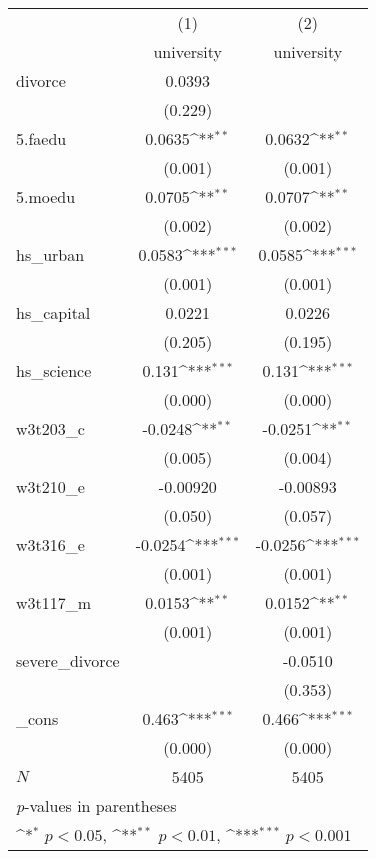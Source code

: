 {
\def\sym#1{\ifmmode^{#1}\else\(^{#1}\)\fi}
\begin{tabular}{l*{2}{c}}
\hline\hline
            &\multicolumn{1}{c}{(1)}&\multicolumn{1}{c}{(2)}\\
            &\multicolumn{1}{c}{university}&\multicolumn{1}{c}{university}\\
\hline
divorce     &      0.0393         &                     \\
            &     (0.229)         &                     \\
[1em]
5.faedu     &      0.0635\sym{**} &      0.0632\sym{**} \\
            &     (0.001)         &     (0.001)         \\
[1em]
5.moedu     &      0.0705\sym{**} &      0.0707\sym{**} \\
            &     (0.002)         &     (0.002)         \\
[1em]
hs\_urban    &      0.0583\sym{***}&      0.0585\sym{***}\\
            &     (0.001)         &     (0.001)         \\
[1em]
hs\_capital  &      0.0221         &      0.0226         \\
            &     (0.205)         &     (0.195)         \\
[1em]
hs\_science  &       0.131\sym{***}&       0.131\sym{***}\\
            &     (0.000)         &     (0.000)         \\
[1em]
w3t203\_c    &     -0.0248\sym{**} &     -0.0251\sym{**} \\
            &     (0.005)         &     (0.004)         \\
[1em]
w3t210\_e    &    -0.00920         &    -0.00893         \\
            &     (0.050)         &     (0.057)         \\
[1em]
w3t316\_e    &     -0.0254\sym{***}&     -0.0256\sym{***}\\
            &     (0.001)         &     (0.001)         \\
[1em]
w3t117\_m    &      0.0153\sym{**} &      0.0152\sym{**} \\
            &     (0.001)         &     (0.001)         \\
[1em]
severe\_divorce&                     &     -0.0510         \\
            &                     &     (0.353)         \\
[1em]
\_cons      &       0.463\sym{***}&       0.466\sym{***}\\
            &     (0.000)         &     (0.000)         \\
\hline
\(N\)       &        5405         &        5405         \\
\hline\hline
\multicolumn{3}{l}{\footnotesize \textit{p}-values in parentheses}\\
\multicolumn{3}{l}{\footnotesize \sym{*} \(p<0.05\), \sym{**} \(p<0.01\), \sym{***} \(p<0.001\)}\\
\end{tabular}
}

